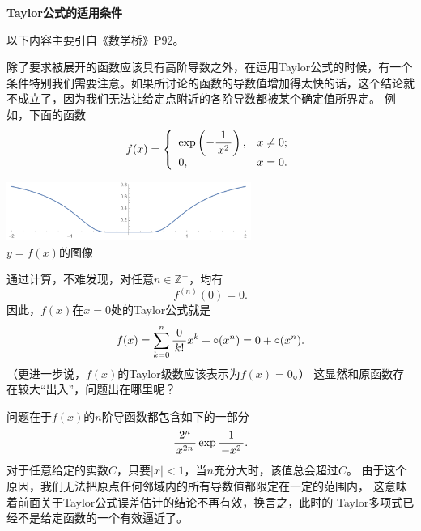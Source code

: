 \begin{shaded}
	{\bf Taylor公式的适用条件}
	
	以下内容主要引自《数学桥》P92。
	
	除了要求被展开的函数应该具有高阶导数之外，在运用Taylor公式的时候，有一个
	条件特别我们需要注意。如果所讨论的函数的导数值增加得太快的话，这个结论就
	不成立了，因为我们无法让给定点附近的各阶导数都被某个确定值所界定。
	例如，下面的函数
	$$f(x)=\left\{\begin{array}{ll}
		\exp\left(-\displaystyle\frac{\,{1}\,}{\,{x^2}\,}\right),&x\ne 0;\\
		0,& x=0.
	\end{array}\right.$$
	\begin{center}
		\includegraphics[width=0.6\textwidth]
		{./images/ch03/e-1x2.pdf}\\
		\kaishu $y=f(x)$的图像
	\end{center}
	通过计算，不难发现，对任意$n\in\mathbb{Z}^+$，均有
	$$f^{(n)}(0)=0.$$
	因此，$f(x)$在$x=0$处的Taylor公式就是
	$$f(x)=\sum\limits_{k=0}^n\displaystyle\frac{\,{0}\,}{\,{k!}\,}x^k+\circ(x^n)
	=0+\circ(x^n).$$
	（更进一步说，$f(x)$的Taylor级数应该表示为$f(x)=0$。）
	这显然和原函数存在较大“出入”，问题出在哪里呢？
	
	问题在于$f(x)$的$n$阶导函数都包含如下的一部分
	$$\displaystyle\frac{\,{2^n}\,}{\,{x^{2n}}\,}\exp\displaystyle\frac{\,{1}\,}{\,{-x^2}\,}.$$
	对于任意给定的实数$C$，只要$|x|<1$，当$n$充分大时，该值总会超过$C$。
	由于这个原因，我们无法把原点任何邻域内的所有导数值都限定在一定的范围内，
	这意味着前面关于Taylor公式误差估计的结论不再有效，换言之，此时的
	Taylor多项式已经不是给定函数的一个有效逼近了。
\end{shaded}

